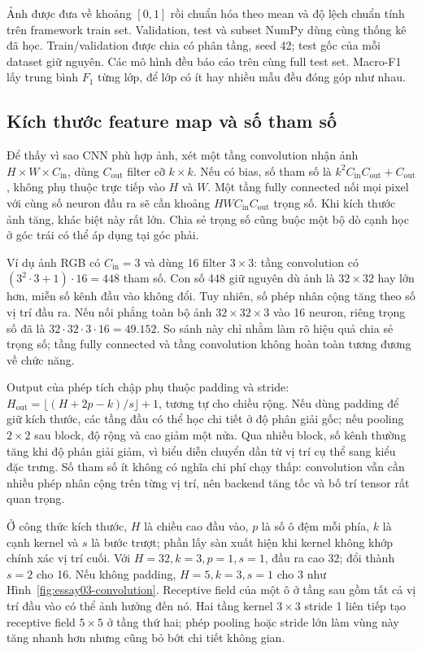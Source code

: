 \documentclass[12pt,a4paper]{report}
\begin{document}
Ảnh được đưa về khoảng $[0,1]$ rồi chuẩn hóa theo mean và độ lệch chuẩn tính trên framework train set. Validation, test và subset NumPy dùng cùng thống kê đã học. Train/validation được chia có phân tầng, seed 42; test gốc của mỗi dataset giữ nguyên. Các mô hình đều báo cáo trên cùng full test set. Macro-F1 lấy trung bình $F_1$ từng lớp, để lớp có ít hay nhiều mẫu đều đóng góp như nhau.

\subsection{Kích thước feature map và số tham số}
Để thấy vì sao CNN phù hợp ảnh, xét một tầng convolution nhận ảnh $H\times W\times C_{\mathrm{in}}$, dùng $C_{\mathrm{out}}$ filter cỡ $k\times k$. Nếu có bias, số tham số là $k^2C_{\mathrm{in}}C_{\mathrm{out}}+C_{\mathrm{out}}$, không phụ thuộc trực tiếp vào $H$ và $W$. Một tầng fully connected nối mọi pixel với cùng số neuron đầu ra sẽ cần khoảng $HWC_{\mathrm{in}}C_{\mathrm{out}}$ trọng số. Khi kích thước ảnh tăng, khác biệt này rất lớn. Chia sẻ trọng số cũng buộc một bộ dò cạnh học ở góc trái có thể áp dụng tại góc phải.

Ví dụ ảnh RGB có $C_{\mathrm{in}}=3$ và dùng 16 filter $3\times3$: tầng convolution có $(3^2\cdot3+1)\cdot16=448$ tham số. Con số 448 giữ nguyên dù ảnh là $32\times32$ hay lớn hơn, miễn số kênh đầu vào không đổi. Tuy nhiên, số phép nhân cộng tăng theo số vị trí đầu ra. Nếu nối phẳng toàn bộ ảnh $32\times32\times3$ vào 16 neuron, riêng trọng số đã là $32\cdot32\cdot3\cdot16=49.152$. So sánh này chỉ nhằm làm rõ hiệu quả chia sẻ trọng số; tầng fully connected và tầng convolution không hoàn toàn tương đương về chức năng.

Output của phép tích chập phụ thuộc padding và stride: $H_{\mathrm{out}}=\lfloor(H+2p-k)/s\rfloor+1$, tương tự cho chiều rộng. Nếu dùng padding để giữ kích thước, các tầng đầu có thể học chi tiết ở độ phân giải gốc; nếu pooling $2\times2$ sau block, độ rộng và cao giảm một nửa. Qua nhiều block, số kênh thường tăng khi độ phân giải giảm, vì biểu diễn chuyển dần từ vị trí cụ thể sang kiểu đặc trưng. Số tham số ít không có nghĩa chi phí chạy thấp: convolution vẫn cần nhiều phép nhân cộng trên từng vị trí, nên backend tăng tốc và bố trí tensor rất quan trọng.

Ở công thức kích thước, $H$ là chiều cao đầu vào, $p$ là số ô đệm mỗi phía, $k$ là cạnh kernel và $s$ là bước trượt; phần lấy sàn xuất hiện khi kernel không khớp chính xác vị trí cuối. Với $H=32,k=3,p=1,s=1$, đầu ra cao 32; đổi thành $s=2$ cho 16. Nếu không padding, $H=5,k=3,s=1$ cho 3 như Hình~\ref{fig:essay03-convolution}. Receptive field của một ô ở tầng sau gồm tất cả vị trí đầu vào có thể ảnh hưởng đến nó. Hai tầng kernel $3\times3$ stride 1 liên tiếp tạo receptive field $5\times5$ ở tầng thứ hai; phép pooling hoặc stride lớn làm vùng này tăng nhanh hơn nhưng cũng bỏ bớt chi tiết không gian.
\end{document}
